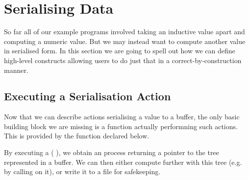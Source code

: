 \section{Serialising Data}\label{sec:serialising}

So far all of our example programs involved taking an inductive value
apart and computing a numeric value.
%
But we may instead want to compute another value in serialised form.
%
In this section we are going to spell out how we can define high-level
constructs allowing users to do just that in a correct-by-construction
manner.






\subsection{Executing a Serialisation Action}

Now that we can describe actions serialising a value to a buffer,
the only basic building block we are missing is a function actually
performning such actions.
%
This is provided by the  function
declared below.


By executing a (  ), we
obtain an  process returning a pointer to the tree 
represented in a buffer.
%
We can then either compute further with this tree (e.g. by calling
 on it), or write it to a file for safekeeping.
